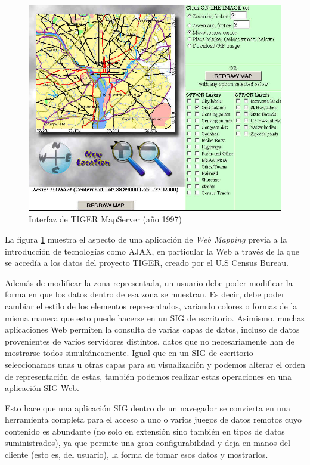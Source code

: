 \begin{figure}[!hbt]   
\centering
\includegraphics[width=.9\mycolumnwidth]{Cliente_servidor/tiger.png}
\caption{\small Interfaz de TIGER MapServer (año 1997)}
\label{Fig:Tiger} 
\end{figure}


La figura \ref{Fig:Tiger} muestra el aspecto de una aplicación de \emph{Web Mapping} previa a la introducción de tecnologías como AJAX, en particular la Web a través de la que se accedía a los datos del proyecto TIGER, creado por el U.S Census Bureau.


Además de modificar la zona representada, un usuario debe poder modificar la forma en que los datos dentro de esa zona se muestran. Es decir, debe poder cambiar el estilo de los elementos representados, variando colores o formas de la misma manera que esto puede hacerse en un SIG de escritorio. Asimismo, muchas aplicaciones Web permiten la consulta de varias capas de datos, incluso de datos provenientes de varios servidores distintos, datos que no necesariamente han de mostrarse todos simultáneamente. Igual que en un SIG de escritorio seleccionamos unas u otras capas para su visualización y podemos alterar el orden de representación de estas, también podemos realizar estas operaciones en una aplicación SIG Web.

Esto hace que una aplicación SIG dentro de un navegador se convierta en una herramienta completa para el acceso a uno o varios juegos de datos remotos cuyo contenido es abundante (no solo en extensión sino también en tipos de datos suministrados), ya que permite una gran configurabilidad y deja en manos del cliente (esto es, del usuario), la forma de tomar esos datos y mostrarlos.

